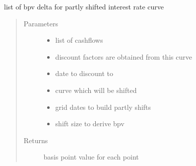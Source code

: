 \documentclass[a4paper,10pt,english]{sphinxmanual}
\begin{document}
\begin{fulllineitems}
\label{\detokenize{api/Derivate:Derivate.get_bucketed_delta}}
\sphinxAtStartPar
list of bpv delta for partly shifted interest rate curve
\begin{quote}\begin{description}
\item[{Parameters}] \leavevmode\begin{itemize}
\item {} 
\sphinxAtStartPar
{} \textendash{} list of cashflows

\item {} 
\sphinxAtStartPar
{} \textendash{} discount factors are obtained from this curve

\item {} 
\sphinxAtStartPar
{} \textendash{} date to discount to

\item {} 
\sphinxAtStartPar
{} \textendash{} curve which will be shifted

\item {} 
\sphinxAtStartPar
{} \textendash{} grid dates to build partly shifts

\item {} 
\sphinxAtStartPar
{} \textendash{} shift size to derive bpv

\end{itemize}

\item[{Returns}] \leavevmode
\sphinxAtStartPar
{} \sphinxhyphen{} basis point value for each  point

\end{description}\end{quote}


\end{fulllineitems}
\end{document}
